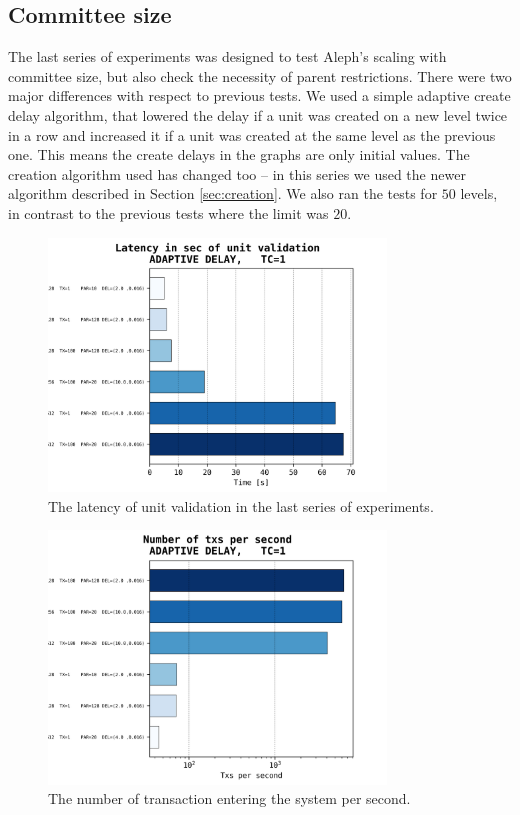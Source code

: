 \documentclass[a4paper,10pt]{article}
\begin{document}
		\subsection{Committee size}
		\FloatBarrier
		The last series of experiments was designed to test Aleph's scaling with committee size, but also check the necessity of parent restrictions.
		There were two major differences with respect to previous tests.
		We used a simple adaptive create delay algorithm, that lowered the delay if a unit was created on a new level twice in a row and increased it if a unit was created at the same level as the previous one.
		This means the create delays in the graphs are only initial values.
		The creation algorithm used has changed too -- in this series we used the newer algorithm described in Section \ref{sec:creation}.
		We also ran the tests for $50$ levels, in contrast to the previous tests where the limit was $20$.
			\begin{figure}[h]
				\centering
				\includegraphics[width=0.8\textwidth]{bar_plots/big/create_ord_del.png}
				\caption{The latency of unit validation in the last series of experiments.}
				\label{fig:bigLatency}
			\end{figure}
			\begin{figure}[h]
				\centering
				\includegraphics[width=0.8\textwidth]{bar_plots/big/txps.png}
				\caption{The number of transaction entering the system per second.}
				\label{fig:bigTxps}
			\end{figure}
\end{document}

